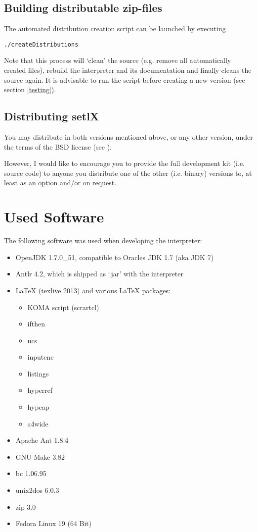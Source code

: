 \subsection{Building distributable zip-files}

The automated distribution creation script can be launched by executing

\begin{lstlisting}[frame=none,numbers=none]
./createDistributions
\end{lstlisting}

Note that this process will `clean' the source (e.g. remove all automatically created files), rebuild the interpreter and its documentation and finally cleans the source again. It is advisable to run the  script before creating a new version (see section \ref{testing}).

\subsection{Distributing setlX}

You may distribute \setlX{} in both versions mentioned above, or any other version, under the terms of the BSD license (see ).

However, I would like to encourage you to provide the full development kit (i.e. source code) to anyone you distribute one of the other (i.e. binary) versions to, at least as an option and\slash{}or on request.

\section{Used Software}

The following software was used when developing the \setlX{} interpreter:

\begin{itemize}
	\item OpenJDK 1.7.0\_51, compatible to Oracles JDK 1.7 (aka JDK 7)
	\item Antlr 4.2, which is shipped as `.jar' with the interpreter
	\item \LaTeX{} (texlive 2013) and various \LaTeX{} packages:
		\begin{itemize}
			\item KOMA script (scrartcl)
			\item ifthen
			\item ucs
			\item inputenc
			\item listings
			\item hyperref
			\item hypcap
			\item a4wide
		\end{itemize}
	\item Apache Ant 1.8.4
	\item GNU Make 3.82
	\item bc 1.06.95
	\item unix2dos 6.0.3
	\item zip 3.0
	\item Fedora Linux 19 (64 Bit)
\end{itemize}


